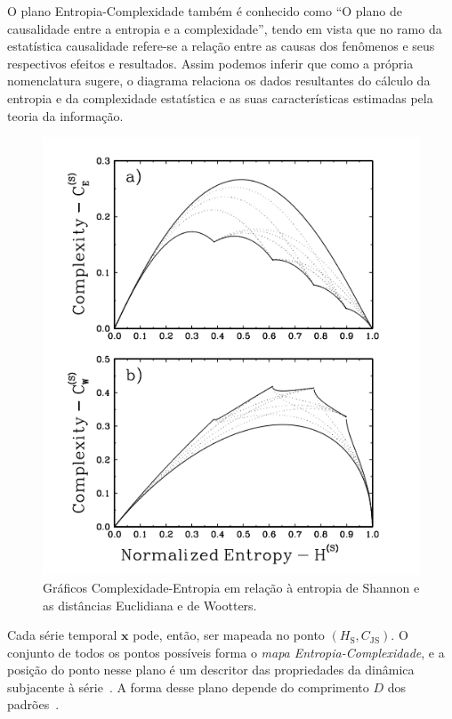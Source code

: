  O plano Entropia-Complexidade também é conhecido como “O plano de causalidade entre a entropia e a complexidade”, tendo em vista que no ramo da estatística causalidade refere-se a relação entre as causas dos fenômenos e seus respectivos efeitos e resultados. Assim podemos inferir que como a própria nomenclatura sugere, o diagrama relaciona os dados resultantes do cálculo da entropia e da complexidade estatística e as suas características estimadas pela teoria da informação. 

\begin{figure}[!hbt]
	\begin{center}
		\includegraphics[width=0.6\columnwidth]{imagens/graficoComplexidade.png}
        \caption{Gráficos Complexidade-Entropia em relação à entropia de Shannon e as distâncias Euclidiana e de Wootters.}
	\end{center}
\end{figure}
 
Cada série temporal $\bm x$ pode, então, ser mapeada no ponto $(H_{\text{S}}, C_{\text{JS}})$.
O conjunto de todos os pontos possíveis forma o \textit{mapa Entropia-Complexidade}, e a posição do ponto nesse plano é um descritor das propriedades da dinâmica subjacente à série~\cite{OrdinalPatternProbabilities}.
A forma desse plano depende do comprimento $D$ dos padrões~\cite{MARTIN2006439}.
